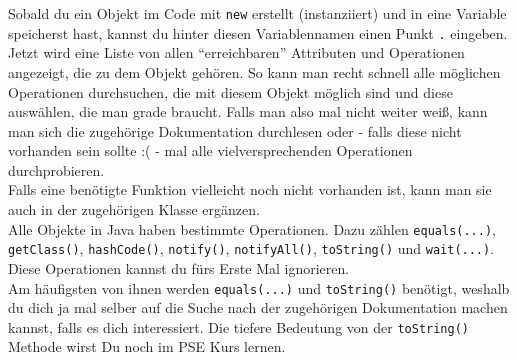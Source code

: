\begin{Infobox}[Autocompletion]
	\label{autocompletions}
    Sobald du ein Objekt im Code mit \lstinline{new} erstellt (instanziiert) und in eine Variable speicherst hast, kannst du hinter diesen Variablennamen einen Punkt \lstinline{.} eingeben.\\
    Jetzt wird eine Liste von allen \enquote{erreichbaren} Attributen und Operationen angezeigt, die zu dem Objekt gehören.
    So kann man recht schnell alle möglichen Operationen durchsuchen, die mit diesem Objekt möglich sind und diese auswählen, die man grade braucht. Falls man also mal nicht weiter weiß, kann man sich die zugehörige Dokumentation durchlesen oder - falls diese nicht vorhanden sein sollte :( - mal alle vielversprechenden Operationen durchprobieren.\\
	Falls eine benötigte Funktion vielleicht noch nicht vorhanden ist, kann man sie auch in der zugehörigen Klasse ergänzen.\\

    Alle Objekte in Java haben bestimmte Operationen. Dazu zählen \lstinline{equals(...)}, \lstinline{getClass()}, \lstinline{hashCode()}, \lstinline{notify()}, \lstinline{notifyAll()}, \lstinline{toString()} und \lstinline{wait(...)}.\\
    Diese Operationen kannst du fürs Erste Mal ignorieren.\\
    Am häufigsten von ihnen werden \lstinline{equals(...)} und \lstinline{toString()} benötigt, weshalb du dich ja mal selber auf die Suche nach der zugehörigen Dokumentation machen kannst, falls es dich interessiert. Die tiefere Bedeutung von der \lstinline{toString()} Methode wirst Du noch im PSE Kurs lernen.
\end{Infobox}

